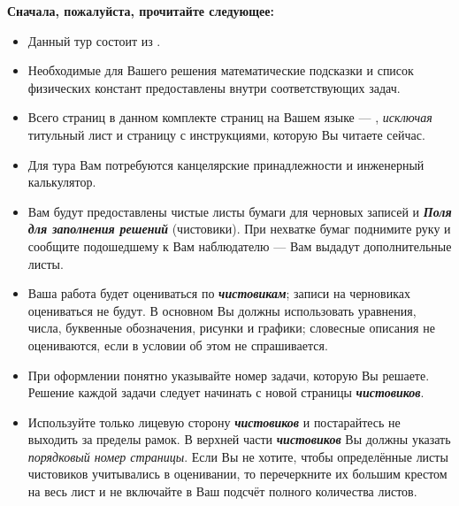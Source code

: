 \thispagestyle{empty}%
%
\begin{center}
    \LARGE\textbf{\scshape{}}
\end{center}
%
\vspace{2pt}%
%
\begin{center}
    \large{}
\end{center}
\vspace{2pt}
\begin{center}
    \large\textbf{Сначала, пожалуйста, прочитайте следующее:}
\end{center}
\vspace{4pt}

\begin{itemize}[leftmargin=*]
    \item Данный тур состоит из .
    \item Необходимые для Вашего решения математические подсказки и список физических констант предоставлены внутри соответствующих задач.
    \item Всего страниц в данном комплекте страниц на Вашем языке ---  \pageref*{LastPage}, \textit{исключая} титульный лист и страницу с инструкциями, которую Вы читаете сейчас.
    \item Для тура Вам потребуются канцелярские принадлежности и инженерный калькулятор.
    \item Вам будут предоставлены чистые листы бумаги для черновых записей и \textbf{\textit{Поля для заполнения решений}} (чистовики). При нехватке бумаг поднимите руку и сообщите подошедшему к Вам наблюдателю --- Вам выдадут дополнительные листы.
    \item Ваша работа будет оцениваться по \textbf{\textit{чистовикам}}; записи на черновиках оцениваться не будут. В основном Вы должны использовать уравнения, числа, буквенные обозначения, рисунки и графики; словесные описания не оцениваются, если в условии об этом не спрашивается.
    \item При оформлении понятно указывайте номер задачи, которую Вы решаете. Решение каждой задачи следует начинать с новой страницы \textbf{\textit{чистовиков}}.
    \item Используйте только лицевую сторону \textbf{\textit{чистовиков}} и постарайтесь не выходить за пределы рамок. В верхней части \textbf{\textit{чистовиков}} Вы должны указать \textit{порядковый номер страницы}. Если Вы не хотите, чтобы определённые листы чистовиков учитывались в оценивании, то перечеркните их большим крестом на весь лист и не включайте в Ваш подсчёт полного количества листов.

\end{itemize}
